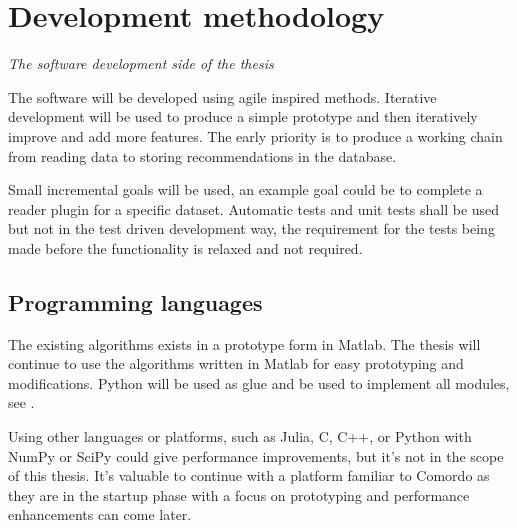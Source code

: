 \section{Development methodology}

\textit{The software development side of the thesis}

The software will be developed using agile inspired methods. Iterative development will be used to produce a simple prototype and then iteratively improve and add more features. The early priority is to produce a working chain from reading data to storing recommendations in the database.

Small incremental goals will be used, an example goal could be to complete a reader plugin for a specific dataset.  Automatic tests and unit tests shall be used but not in the test driven development way, the requirement for the tests being made before the functionality is relaxed and not required.


\subsection{Programming languages}

The existing algorithms exists in a prototype form in Matlab. The thesis will continue to use the algorithms written in Matlab for easy prototyping and modifications. Python will be used as glue and be used to implement all modules, see .

Using other languages or platforms, such as Julia, C, C++, or Python with NumPy or SciPy could give performance improvements, but it's not in the scope of this thesis.  It's valuable to continue with a platform familiar to Comordo as they are in the startup phase with a focus on prototyping and performance enhancements can come later.

